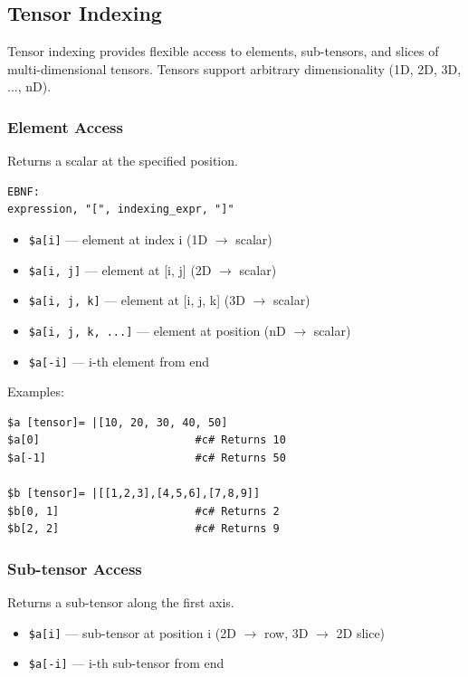 \subsection{Tensor Indexing}
Tensor indexing provides flexible access to elements, sub-tensors, and slices of multi-dimensional tensors. Tensors support arbitrary dimensionality (1D, 2D, 3D, ..., nD).

\subsubsection{Element Access}
Returns a scalar at the specified position.
\begin{verbatim}
EBNF:
expression, "[", indexing_expr, "]"
\end{verbatim}

\begin{itemize}
\item \texttt{\$a[i]} --- element at index i (1D $\rightarrow$ scalar)
\item \texttt{\$a[i, j]} --- element at [i, j] (2D $\rightarrow$ scalar)
\item \texttt{\$a[i, j, k]} --- element at [i, j, k] (3D $\rightarrow$ scalar)
\item \texttt{\$a[i, j, k, ...]} --- element at position (nD $\rightarrow$ scalar)
\item \texttt{\$a[-i]} --- i-th element from end
\end{itemize}

Examples:
\begin{verbatim}
$a [tensor]= |[10, 20, 30, 40, 50]
$a[0]                        #c# Returns 10
$a[-1]                       #c# Returns 50

$b [tensor]= |[[1,2,3],[4,5,6],[7,8,9]]
$b[0, 1]                     #c# Returns 2
$b[2, 2]                     #c# Returns 9
\end{verbatim}

\subsubsection{Sub-tensor Access}
Returns a sub-tensor along the first axis.
\begin{itemize}
\item \texttt{\$a[i]} --- sub-tensor at position i (2D $\rightarrow$ row, 3D $\rightarrow$ 2D slice)
\item \texttt{\$a[-i]} --- i-th sub-tensor from end
\end{itemize}

